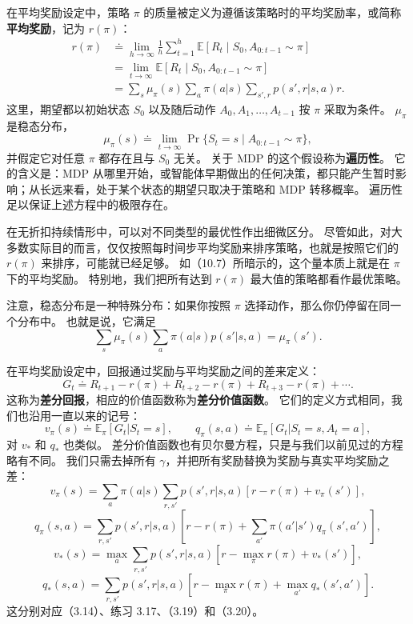\documentclass[UTF8,12pt,a4paper,fontset=fandol]{ctexart}
\begin{document}
在平均奖励设定中，策略 $\pi$ 的质量被定义为遵循该策略时的平均奖励率，或简称\textbf{平均奖励}，记为 $r(\pi)$：
\begin{align}
r(\pi)
&\doteq \lim_{h\to\infty}\frac{1}{h}\sum_{t=1}^h \mathbb{E}\left[R_t\mid S_0,A_{0:t-1}\sim\pi\right] \tag{10.6}\\
&= \lim_{t\to\infty}\mathbb{E}\left[R_t\mid S_0,A_{0:t-1}\sim\pi\right] \tag{10.7}\\
&= \sum_s \mu_\pi(s)\sum_a\pi(a|s)\sum_{s',r}p(s',r|s,a)r.
\end{align}
这里，期望都以初始状态 $S_0$ 以及随后动作 $A_0,A_1,\ldots,A_{t-1}$ 按 $\pi$ 采取为条件。
$\mu_\pi$ 是稳态分布，
\[
\mu_\pi(s)\doteq \lim_{t\to\infty}\Pr\{S_t=s\mid A_{0:t-1}\sim\pi\},
\]
并假定它对任意 $\pi$ 都存在且与 $S_0$ 无关。
关于 MDP 的这个假设称为\textbf{遍历性}。
它的含义是：MDP 从哪里开始，或智能体早期做出的任何决策，都只能产生暂时影响；从长远来看，处于某个状态的期望只取决于策略和 MDP 转移概率。
遍历性足以保证上述方程中的极限存在。

在无折扣持续情形中，可以对不同类型的最优性作出细微区分。
尽管如此，对大多数实际目的而言，仅仅按照每时间步平均奖励来排序策略，也就是按照它们的 $r(\pi)$ 来排序，可能就已经足够。
如（10.7）所暗示的，这个量本质上就是在 $\pi$ 下的平均奖励。
特别地，我们把所有达到 $r(\pi)$ 最大值的策略都看作最优策略。

注意，稳态分布是一种特殊分布：如果你按照 $\pi$ 选择动作，那么你仍停留在同一个分布中。
也就是说，它满足
\begin{equation}
\sum_s\mu_\pi(s)\sum_a\pi(a|s)p(s'|s,a)=\mu_\pi(s').
\tag{10.8}
\end{equation}

在平均奖励设定中，回报通过奖励与平均奖励之间的差来定义：
\begin{equation}
G_t\doteq R_{t+1}-r(\pi)+R_{t+2}-r(\pi)+R_{t+3}-r(\pi)+\cdots.
\tag{10.9}
\end{equation}
这称为\textbf{差分回报}，相应的价值函数称为\textbf{差分价值函数}。
它们的定义方式相同，我们也沿用一直以来的记号：
\[
v_\pi(s)\doteq \mathbb{E}_\pi[G_t|S_t=s],\qquad
q_\pi(s,a)\doteq \mathbb{E}_\pi[G_t|S_t=s,A_t=a],
\]
对 $v_*$ 和 $q_*$ 也类似。
差分价值函数也有贝尔曼方程，只是与我们以前见过的方程略有不同。
我们只需去掉所有 $\gamma$，并把所有奖励替换为奖励与真实平均奖励之差：
\[
v_\pi(s)=\sum_a\pi(a|s)\sum_{r,s'}p(s',r|s,a)\left[r-r(\pi)+v_\pi(s')\right],
\]
\[
q_\pi(s,a)=\sum_{r,s'}p(s',r|s,a)\left[r-r(\pi)+\sum_{a'}\pi(a'|s')q_\pi(s',a')\right],
\]
\[
v_*(s)=\max_a\sum_{r,s'}p(s',r|s,a)\left[r-\max_\pi r(\pi)+v_*(s')\right],
\]
\[
q_*(s,a)=\sum_{r,s'}p(s',r|s,a)\left[r-\max_\pi r(\pi)+\max_{a'}q_*(s',a')\right].
\]
这分别对应（3.14）、练习 3.17、（3.19）和（3.20）。
\end{document}

